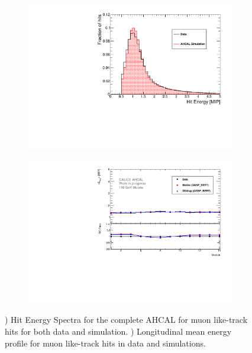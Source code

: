 \begin{figure}[htbp!]
	\centering
	\begin{subfigure}[t]{0.49\textwidth}
		\includegraphics[width=1\linewidth]{../Thesis_Plots/EnergyCalib/Plots/ComparisonMCData_MIPPeak.pdf}
		\caption{} \label{fig:MIPData_MC}
	\end{subfigure}
	\hfill
	\begin{subfigure}[t]{0.5\textwidth}
		\centering
		\includegraphics[width=1\linewidth]{../Thesis_Plots/Timing/Muons/Plots/ProfileMuons_Edep.pdf}
		\caption{} \label{fig:muEdep}
	\end{subfigure}
	\caption{) Hit Energy Spectra for the complete AHCAL for muon like-track hits for both data and simulation. ) Longitudinal mean energy profile for muon like-track hits in data and simulations.}
	\label{fig:Val}
\end{figure}

